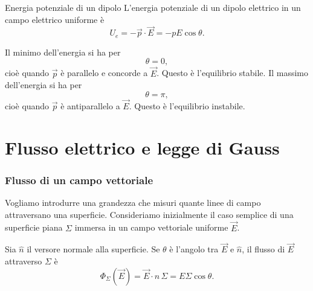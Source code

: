 \documentclass[a4paper]{article}
\begin{document}
\begin{snippettheorem}{Energia potenziale di un dipolo}
    L'energia potenziale di un dipolo elettrico in un campo elettrico uniforme è
    \[
        U_e=-\vec{p}\cdot\vec{E}=-pE\cos\theta.
    \]
\end{snippettheorem}

\begin{center}
\end{center}

Il minimo dell'energia si ha per
\[
    \theta=0,
\]
cioè quando \(\vec{p}\) è parallelo e concorde a \(\vec{E}\). Questo è l'equilibrio stabile. Il massimo dell'energia si ha per
\[
    \theta=\pi,
\]
cioè quando \(\vec{p}\) è antiparallelo a \(\vec{E}\). Questo è l'equilibrio instabile.

\pagebreak
\part{Flusso elettrico e legge di Gauss}

\section{Flusso di un campo vettoriale}

Vogliamo introdurre una grandezza che misuri quante linee di campo attraversano una superficie. Consideriamo inizialmente il caso semplice di una superficie piana \(\Sigma\) immersa in un campo vettoriale uniforme \(\vec{E}\).

Sia \(\hat{n}\) il versore normale alla superficie. Se \(\theta\) è l'angolo tra \(\vec{E}\) e \(\hat{n}\), il flusso di \(\vec{E}\) attraverso \(\Sigma\) è
\[
    \Phi_\Sigma(\vec{E})=\vec{E}\cdot\hat{n}\,\Sigma
    =E\Sigma\cos\theta.
\]
\end{document}
